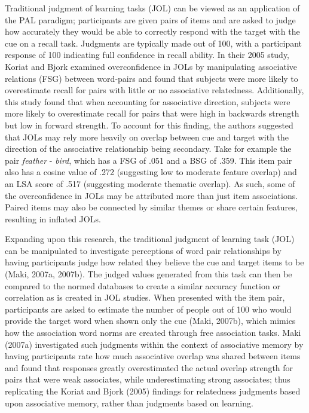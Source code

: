 \documentclass[english,man]{apa6}
\theoremstyle{definition}
\theoremstyle{definition}
\theoremstyle{definition}
\theoremstyle{remark}
\begin{document}
Traditional judgment of learning tasks (JOL) can be viewed as an
application of the PAL paradigm; participants are given pairs of items
and are asked to judge how accurately they would be able to correctly
respond with the target with the cue on a recall task. Judgments are
typically made out of 100, with a participant response of 100 indicating
full confidence in recall ability. In their 2005 study, Koriat and Bjork
examined overconfidence in JOLs by manipulating associative relations
(FSG) between word-pairs and found that subjects were more likely to
overestimate recall for pairs with little or no associative relatedness.
Additionally, this study found that when accounting for associative
direction, subjects were more likely to overestimate recall for pairs
that were high in backwards strength but low in forward strength. To
account for this finding, the authors suggested that JOLs may rely more
heavily on overlap between cue and target with the direction of the
associative relationship being secondary. Take for example the pair
\emph{feather} - \emph{bird}, which has a FSG of .051 and a BSG of .359.
This item pair also has a cosine value of .272 (suggesting low to
moderate feature overlap) and an LSA score of .517 (suggesting moderate
thematic overlap). As such, some of the overconfidence in JOLs may be
attributed more than just item associations. Paired items may also be
connected by similar themes or share certain features, resulting in
inflated JOLs.

Expanding upon this research, the traditional judgment of learning task
(JOL) can be manipulated to investigate perceptions of word pair
relationships by having participants judge how related they believe the
cue and target items to be (Maki, 2007a, 2007b). The judged values
generated from this task can then be compared to the normed databases to
create a similar accuracy function or correlation as is created in JOL
studies. When presented with the item pair, participants are asked to
estimate the number of people out of 100 who would provide the target
word when shown only the cue (Maki, 2007b), which mimics how the
association word norms are created through free association tasks. Maki
(2007a) investigated such judgments within the context of associative
memory by having participants rate how much associative overlap was
shared between items and found that responses greatly overestimated the
actual overlap strength for pairs that were weak associates, while
underestimating strong associates; thus replicating the Koriat and Bjork
(2005) findings for relatedness judgments based upon associative memory,
rather than judgments based on learning.
\end{document}
